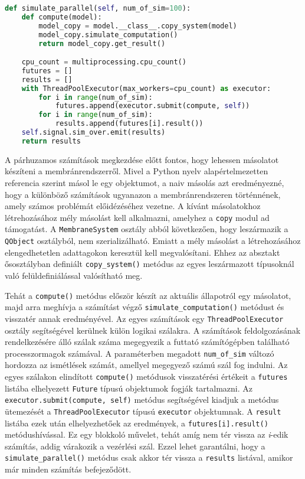 \begin{lstlisting}[language={Python}]
def simulate_parallel(self, num_of_sim=100):
	def compute(model):
		model_copy = model.__class__.copy_system(model)
		model_copy.simulate_computation()
		return model_copy.get_result()

	cpu_count = multiprocessing.cpu_count()
	futures = []
	results = []
	with ThreadPoolExecutor(max_workers=cpu_count) as executor:
		for i in range(num_of_sim):
			futures.append(executor.submit(compute, self))
		for i in range(num_of_sim):
			results.append(futures[i].result())
	self.signal.sim_over.emit(results)
	return results
\end{lstlisting}

A párhuzamos számítások megkezdése előtt fontos, hogy lehessen másolatot készíteni a membránrendszerről. Mivel a Python nyelv alapértelmezetten referencia szerint másol le egy objektumot, a naiv másolás azt eredményezné, hogy a különböző számítások ugyanazon a membránrendszeren történnének, amely számos problémát előidézéséhez vezetne. A kívánt másolatokhoz létrehozásához mély másolást kell alkalmazni, amelyhez a \verb|copy| modul ad támogatást. A \verb|MembraneSystem| osztály abból következően, hogy leszármazik a \verb|QObject| osztályból, nem szerializálható. Emiatt a mély másolást a létrehozásához elengedhetetlen adattagokon keresztül kell megvalósítani.
Ehhez az absztakt ősosztályban definiált \verb|copy_system()| metódus az egyes leszármazott típusoknál való felüldefiniálással valósítható meg.

Tehát a \verb|compute()| metódus először készít az aktuális állapotról egy másolatot, majd arra meghívja a számítást végző \verb|simulate_computation()| metódust és visszatér annak eredményével.
Az egyes számítások egy \verb|ThreadPoolExecutor| osztály segítségével kerülnek külön logikai szálakra. A számítások feldolgozásának rendelkezésére álló szálak száma megegyezik a futtató számítógépben található processzormagok számával. A paraméterben megadott \verb|num_of_sim| változó hordozza az ismétlések számát, amellyel megegyező számú szál fog indulni. Az egyes szálakon elindított \verb|compute()| metódusok visszatérési értékeit a \verb|futures| listába elhelyezett \verb|Future| típusú objektumok fogják tartalmazni. Az \verb|executor.submit(compute, self)| metódus segítségével kiadjuk a metódus ütemezését a \verb|ThreadPoolExecutor| típusú \verb|executor| objektumnak. A \verb|result | listába ezek után elhelyezhetőek az eredmények, a \verb|futures[i].result()| metódushívással. Ez egy blokkoló művelet, tehát amíg nem tér vissza az \textit{i}-edik számítás, addig várakozik a vezérlési szál. Ezzel lehet garantálni, hogy a \verb|simulate_parallel()| metódus csak akkor tér vissza a \verb|results| listával, amikor már minden számítás befejeződött. 

